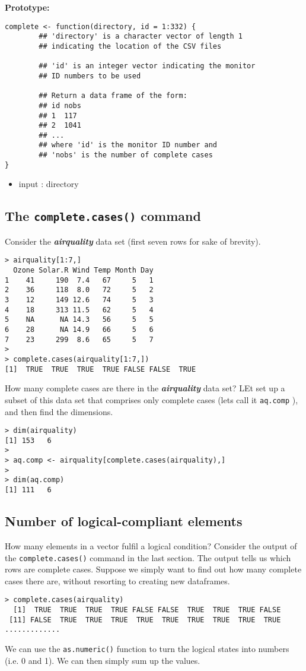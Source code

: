 \documentclass[12pt]{article}
\begin{document}
\bigskip
\noindent \textbf{Prototype:}
\begin{framed}
\begin{verbatim}
complete <- function(directory, id = 1:332) {
        ## 'directory' is a character vector of length 1 
        ## indicating the location of the CSV files

        ## 'id' is an integer vector indicating the monitor 
        ## ID numbers to be used
        
        ## Return a data frame of the form:
        ## id nobs
        ## 1  117
        ## 2  1041
        ## ...
        ## where 'id' is the monitor ID number and 
        ## 'nobs' is the number of complete cases
}
\end{verbatim} 
\end{framed}
\begin{itemize}
\item input : directory
\end{itemize}
\newpage
\subsection{The \texttt{complete.cases()} command}
Consider the \textit{\textbf{airquality}} data set (first seven rows for sake of brevity).
\begin{verbatim}
> airquality[1:7,]
  Ozone Solar.R Wind Temp Month Day
1    41     190  7.4   67     5   1
2    36     118  8.0   72     5   2
3    12     149 12.6   74     5   3
4    18     313 11.5   62     5   4
5    NA      NA 14.3   56     5   5
6    28      NA 14.9   66     5   6
7    23     299  8.6   65     5   7
>
> complete.cases(airquality[1:7,])
[1]  TRUE  TRUE  TRUE  TRUE FALSE FALSE  TRUE
\end{verbatim}
How many complete cases are there in the \textit{\textbf{airquality}} data set? LEt set up a subset of this data set that comprises only complete cases (lets call it \texttt{aq.comp} ), and then find the dimensions.
\begin{verbatim}
> dim(airquality)
[1] 153   6
>
> aq.comp <- airquality[complete.cases(airquality),] 
>
> dim(aq.comp)
[1] 111   6
\end{verbatim}

\newpage
\subsection{Number of logical-compliant elements}
How many elements in a vector fulfil a logical condition? Consider the output of the \texttt{complete.cases()} command in the last section. The output tells us which rows are complete cases. Suppose we simply want to find out how many complete cases there are, without resorting to creating new dataframes.
\begin{verbatim}
> complete.cases(airquality)
  [1]  TRUE  TRUE  TRUE  TRUE FALSE FALSE  TRUE  TRUE  TRUE FALSE
 [11] FALSE  TRUE  TRUE  TRUE  TRUE  TRUE  TRUE  TRUE  TRUE  TRUE
.............

\end{verbatim}
We can use the \texttt{as.numeric()} function to turn the logical states into numbers (i.e. 0 and 1). We can then simply sum up the values.
\end{document}
